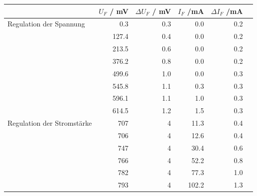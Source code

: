 \documentclass[11pt,ngerman]{scrartcl}
\begin{document}
\begin{center}
	\begin{tabular}{lrrrrr}
		\toprule
		{}                         & {$U_F$} / mV & {$\Delta U_F$} / mV & {$I_F$} /mA & {$\Delta I_F$} /mA \\
		\midrule
		Regulation der Spannung    & 0.3          & 0.3                 & 0.0         & 0.2                \\
		                           & 127.4        & 0.4                 & 0.0         & 0.2                \\
		                           & 213.5        & 0.6                 & 0.0         & 0.2                \\
		                           & 376.2        & 0.8                 & 0.0         & 0.2                \\
		                           & 499.6        & 1.0                 & 0.0         & 0.3                \\
		                           & 545.8        & 1.1                 & 0.3         & 0.3                \\
		                           & 596.1        & 1.1                 & 1.0         & 0.3                \\
		                           & 614.5        & 1.2                 & 1.5         & 0.3                \\
		\midrule
		Regulation der Stromstärke & 707          & 4                   & 11.3        & 0.4                \\
		                           & 706          & 4                   & 12.6        & 0.4                \\
		                           & 747          & 4                   & 30.4        & 0.6                \\
		                           & 766          & 4                   & 52.2        & 0.8                \\
		                           & 782          & 4                   & 77.3        & 1.0                \\
		                           & 793          & 4                   & 102.2       & 1.3                \\
		\bottomrule
	\end{tabular}
	\label{tab:1a}
\end{center}
\end{document}
